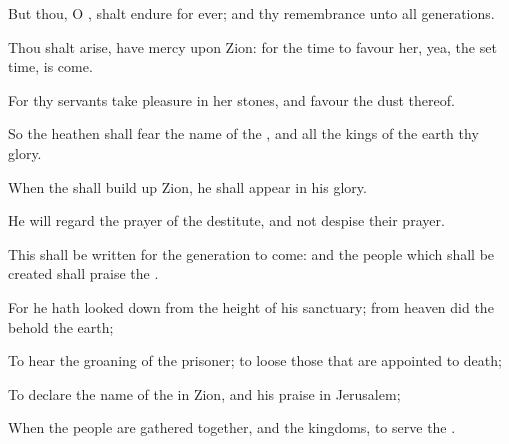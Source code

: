 {\Q {}But thou, O
{}, shalt
endure for
ever; and thy
remembrance unto
all
generations.


\par }{\Q {}Thou shalt
arise,
{} have
mercy upon
Zion: for the
time to
favour her, yea, the set
time, is
come.


\par }{\Q {}For thy
servants take
pleasure in her
stones, and
favour the
dust thereof.


\par }{\Q {}So the
heathen shall
fear the
name of the
{}, and all the
kings of the
earth thy
glory.


\par }{\Q {}When the
{} shall build
up
Zion, he shall
appear in his
glory.


\par }{\Q {}He will
regard the
prayer of the
destitute, and not
despise their
prayer.


\par }{\Q {}This shall be
written for the
generation to
come: and the
people which shall be
created shall
praise the
{}.


\par }{\Q {}For he hath looked
down from the
height of his
sanctuary; from
heaven did the
{}
behold the
earth;


\par }{\Q {}To
hear the
groaning of the
prisoner; to
loose those that are
appointed to
death;


\par }{\Q {}To
declare the
name of the
{} in
Zion, and his
praise in
Jerusalem;


\par }{\Q {}When the
people are
gathered
together, and the
kingdoms, to
serve the
{}.


\par }{\BB \par }
